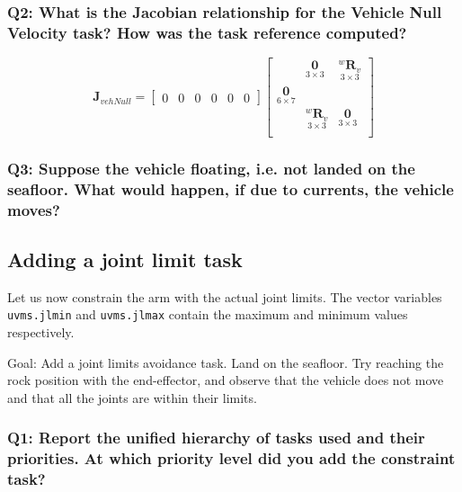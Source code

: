 \documentclass{article}
\begin{document}
\subsubsection{Q2: What is the Jacobian relationship for the Vehicle Null Velocity task? How was the task reference computed?}
\begin{equation}
\boldsymbol{J}_{vehNull}=\begin{bmatrix} 0 & 0 & 0 & 0 & 0 & 0
\end{bmatrix}
    \begin{bmatrix}
     & \underset{3\times 3}{\boldsymbol{0}} & \underset{ 3\times 3}{^{w}\boldsymbol{R}_{v}} \\
     \underset{6\times 7}{\boldsymbol{0}} \\
     & \underset{ 3\times 3}{^{w}\boldsymbol{R}_{v}} & \underset{3\times 3}{\boldsymbol{0}} \\
    \end{bmatrix}
\end{equation}
\subsubsection{Q3: Suppose the vehicle floating, i.e. not landed on the seafloor. What would happen, if due to currents, the vehicle moves?}

\clearpage

\subsection{Adding a joint limit task}
Let us now constrain the arm with the actual joint limits. The vector variables \texttt{uvms.jlmin} and \texttt{uvms.jlmax} contain the maximum and minimum values respectively.

Goal: Add a joint limits avoidance task. Land on the seafloor. Try reaching the rock position with the end-effector, and observe that the vehicle does not move and that all the joints are within their limits.

\subsubsection{Q1: Report the unified hierarchy of tasks used and their priorities. At which priority level did you add the constraint task?}
\end{document}
